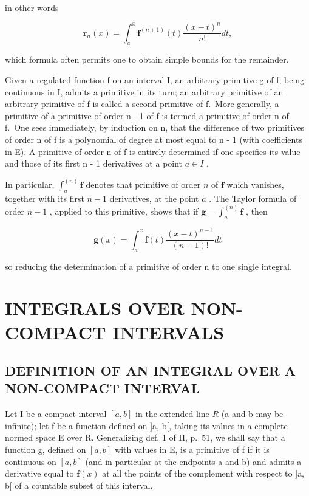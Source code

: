 in other words

\[
\mathbf {r} _ {n} (x) = \int_ {a} ^ {x} \mathbf {f} ^ {(n + 1)} (t) \frac {(x - t) ^ {n}}{n !} d t,\tag{18}
\]

which formula often permits one to obtain simple bounds for the remainder.

Given a regulated function f on an interval I, an arbitrary primitive g of f, being continuous in I, admits a primitive in its turn; an arbitrary primitive of an arbitrary primitive of f is called a second primitive of f.~More generally, a primitive of a primitive of order n - 1 of f is termed a primitive of order n of f.~One sees immediately, by induction on n, that the difference of two primitives of order n of f is a polynomial of degree at most equal to n - 1 (with coefficients in E). A primitive of order n of f is entirely determined if one specifies its value and those of its first n - 1 derivatives at a point \(a \in I\) .

In particular, \(\int_{a}^{(n)}\mathbf{f}\) denotes that primitive of order \(n\) of \(\mathbf{f}\) which vanishes, together with its first \(n - 1\) derivatives, at the point \(a\) . The Taylor formula of order \(n - 1\) , applied to this primitive, shows that if \(\mathbf{g} = \int_{a}^{(n)}\mathbf{f}\) , then

\[
\mathbf {g} (x) = \int_ {a} ^ {x} \mathbf {f} (t) \frac {(x - t) ^ {n - 1}}{(n - 1) !} d t\tag{19}
\]

so reducing the determination of a primitive of order n to one single integral.

\section{INTEGRALS OVER NON-COMPACT INTERVALS}

\subsection{DEFINITION OF AN INTEGRAL OVER A NON-COMPACT INTERVAL}

Let I be a compact interval \([a, b]\) in the extended line \(\overline{R}\) (a and b may be infinite); let f be a function defined on {]}a, b{[}, taking its values in a complete normed space E over R. Generalizing def. 1 of II, p.~51, we shall say that a function g, defined on \([a, b]\) with values in E, is a primitive of f if it is continuous on \([a, b]\) (and in particular at the endpoints a and b) and admits a derivative equal to \(\mathbf{f}(x)\) at all the points of the complement with respect to {]}a, b{[} of a countable subset of this interval.

